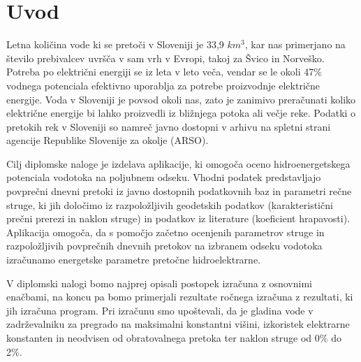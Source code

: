 
\chapter{Uvod}\label{sec: Uvod}
\thispagestyle{fancy}


Letna količina vode ki se pretoči v Sloveniji je 33,9 $km^{3}$, kar nas primerjano na število prebivalcev uvršča v sam vrh v Evropi, takoj za Švico in Norveško. Potreba po električni energiji se iz leta v leto veča, vendar se le okoli 47\% vodnega potenciala efektivno uporablja za potrebe proizvodnje električne energije. Voda v Sloveniji je povsod okoli nas, zato je zanimivo preračunati koliko električne energije bi lahko proizvedli iz bližnjega potoka ali večje reke. Podatki o pretokih rek v Sloveniji so namreč javno dostopni v arhivu na spletni strani agencije Republike Slovenije za okolje (ARSO). \cite{HEnaSrednjiSavi}


Cilj diplomske naloge je izdelava aplikacije, ki omogoča oceno hidroenergetskega potenciala vodotoka na poljubnem odseku. Vhodni podatek predstavljajo povprečni dnevni pretoki iz javno dostopnih podatkovnih baz in parametri rečne struge, ki jih določimo iz razpoložljivih geodetskih podatkov (karakteristični prečni prerezi in naklon struge) in podatkov iz literature (koeficient hrapavosti). Aplikacija omogoča, da s pomočjo začetno ocenjenih parametrov struge in razpoložljivih povprečnih dnevnih pretokov na izbranem odseku vodotoka izračunamo energetske parametre pretočne hidroelektrarne.


V diplomski nalogi bomo najprej opisali postopek izračuna z osnovnimi enačbami, na koncu pa bomo primerjali rezultate ročnega izračuna z rezultati, ki jih izračuna program. Pri izračunu smo upoštevali, da je gladina vode v zadrževalniku za pregrado na maksimalni konstantni višini, izkoristek elektrarne konstanten in neodvisen od obratovalnega pretoka ter naklon struge od 0\% do 2\%.



